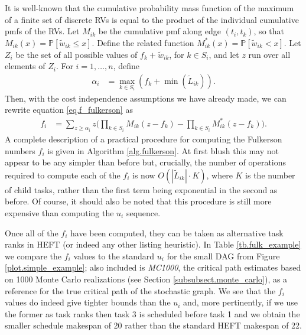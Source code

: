 \documentclass[12pt]{article}
\def\P{\mathbb{P}}
\begin{document}
It is well-known that the cumulative probability mass function of the maximum of a finite set of discrete RVs is equal to the product of the individual cumulative pmfs of the RVs. Let $M_{ik}$ be the cumulative pmf along edge $(t_i, t_k)$, so that $M_{ik}(x) = \P[\tilde{w}_{ik} \leq x]$. Define the related function $M_{ik}^{*}(x) = \P[\tilde{w}_{ik} < x]$. Let $Z_i$ be the set of all possible values of $f_k + \tilde{w}_{ik}$, for $k \in S_i$, and let $z$ run over all elements of $Z_i$. For $i = 1, \dots, n$, define 
\begin{align}
\alpha_i &= \max_{k \in S_i}(f_k + \min(\tilde{L}_{ik})).
\end{align}
Then, with the cost independence assumptions we have already made, we can rewrite equation \eqref{eq.f_fulkerson} as 
\begin{align}
f_i &= \sum_{z \geq \alpha_i} z \bigg( \prod_{k \in S_i} M_{ik}(z - f_k) - \prod_{k \in S_i} M_{ik}^{*}(z - f_k) \bigg). \label{eq.f_clingen}
\end{align}
A complete description of a practical procedure for computing the Fulkerson numbers $f_i$ is given in Algorithm \ref{alg.fulkerson}. At first blush this may not appear to be any simpler than before but, crucially, the number of  operations required to compute each of the $f_i$ is now $O(|\tilde{L}_{ik}| \cdot K)$, where $K$ is the number of child tasks, rather than the first term being exponential in the second as before. Of course, it should also be noted that this procedure is still more expensive than computing the $u_i$ sequence. 

Once all of the $f_i$ have been computed, they can be taken as alternative task ranks in HEFT (or indeed any other listing heuristic). In Table \ref{tb.fulk_example} we compare the $f_i$ values to the standard $u_i$ for the small DAG from Figure \ref{plot.simple_example}; also included is {\em MC1000}, the critical path estimates based on 1000 Monte Carlo realizations (see Section \ref{subsubsect.monte_carlo}), as a reference for the true critical path of the stochastic graph. We see that the $f_i$ values do indeed give tighter bounds than the $u_i$ and, more pertinently, if we use the former as task ranks then task 3 is scheduled before task 1 and we obtain the smaller schedule makespan of 20 rather than the standard HEFT makespan of 22. 
\end{document}

